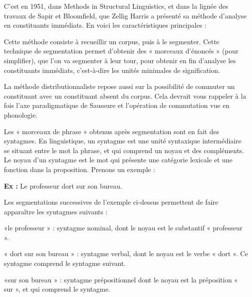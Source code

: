 
C’est en 1951, dans Methods in Structural Linguistics, et dans la lignée des travaux de Sapir et Bloomfield, que Zellig Harris a présenté sa méthode d’analyse en constituants immédiats. En voici les caractéristiques principales :\par


Cette méthode consiste à recueillir un corpus, puis à le segmenter. Cette technique de segmentation permet d'obtenir des « morceaux d’énoncés » (pour simplifier), que l’on va segmenter à leur tour, pour obtenir en fin d’analyse les constituants immédiats, c’est-à-dire les unités minimales de signification.\par


La méthode distributionnaliste repose aussi sur la possibilité de commuter un constituant avec un constituant absent du corpus. Cela devrait vous rappeler à la fois l’axe paradigmatique de Saussure et l’opération de commutation vue en phonologie.\par


Les « morceaux de phrase » obtenus après segmentation sont en fait des syntagmes. En linguistique, un syntagme est une unité syntaxique intermédiaire se situant entre le mot la phrase, et qui comprend un noyau et des compléments. Le noyau d’un syntagme est le mot qui présente une catégorie lexicale et une fonction dans la proposition. Prenons un exemple :\par

\noindent\textbf{Ex :} Le professeur dort sur son bureau.\par

Les segmentations successives de l’exemple ci-dessus permettent de faire apparaître les syntagmes suivants :\par


«le professeur » : syntagme nominal, dont le noyau est le substantif « professeur ».\par

« dort sur son bureau » : syntagme verbal, dont le noyau est le verbe « dort ». Ce syntagme comprend le syntagme suivant.\par

«sur son bureau » : syntagme prépositionnel dont le noyau est la préposition « sur », et qui comprend le syntagme.\par

